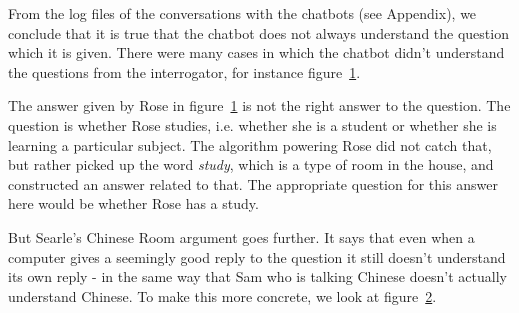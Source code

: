 From the log files of the conversations with the chatbots (see Appendix), we conclude that it is true that the chatbot does not always understand the question which it is given. There were many cases in which the chatbot didn't understand the questions from the interrogator, for instance figure~\ref{Example1}.

\begin{figure}[ht]
   \begin{center}
   \end{center}
   \caption{}
   \label{Example1}
\end{figure}

The answer given by Rose in figure~\ref{Example1} is not the right answer to the question. The question is whether Rose studies, i.e. whether she is a student or whether she is learning a particular subject. The algorithm powering Rose did not catch that, but rather picked up the word \textit{study}, which is a type of room in the house, and constructed an answer related to that. The appropriate question for this answer here would be whether Rose has a study.

But Searle's Chinese Room argument goes further. It says that even when a computer gives a seemingly good reply to the question it still doesn't understand its own reply - in the same way that Sam who is talking Chinese doesn't actually understand Chinese. To make this more concrete, we look at figure~\ref{Example2}.

\begin{figure}[ht]
   \begin{center}
   \end{center}
   \caption{}
   \label{Example2}
\end{figure}

